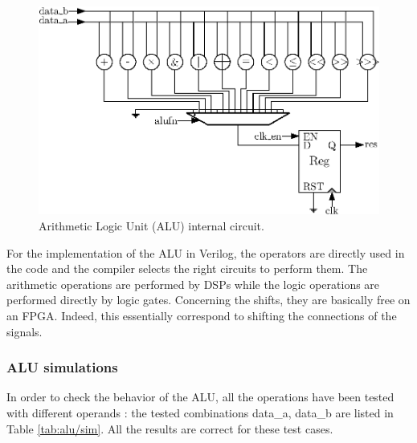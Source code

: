 \begin{figure}[H]
    \centering
    \includegraphics[width=\linewidth]{Chapter3-CPU/res/alu_internal}
    \caption{Arithmetic Logic Unit (ALU) internal circuit.}
    \label{fig:components/alu_in}
\end{figure}


For the implementation of the ALU in Verilog, the operators are directly used in the code and the 
compiler selects the right circuits to perform them. The arithmetic operations are 
performed by DSPs while the logic operations are performed directly by logic gates. Concerning the
shifts, they are basically free on an FPGA. Indeed, this essentially correspond to shifting the 
connections of the signals.

\subsubsection*{ALU simulations}

In order to check the behavior of the ALU, all the operations have been tested with different 
operands : the tested combinations data\_a, data\_b are listed in Table \ref{tab:alu/sim}. 
All the results are correct for these test cases.

